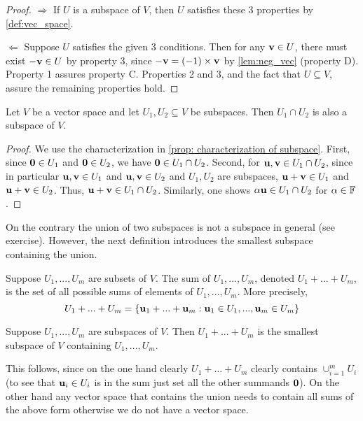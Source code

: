 \documentclass{article}
\begin{document}
\begin{proof}
$\Rightarrow$ If $U$ is a subspace of $V$, then $U$ satisfies these 3 properties by \cref{def:vec_space}.

$\Leftarrow$ Suppose $U$ satisfies the given 3 conditions. Then for any ${\mathbf{v}} \in U$, there must exist $-{\mathbf{v}} \in U$ by property 3, since $-{\mathbf{v}} = (-1) \times {\mathbf{v}}$ by \cref{lem:neg_vec} (property D). Property 1 assures property C. Properties 2 and 3, and the fact that $U \subseteq V$, assure the remaining properties hold. 
\end{proof}

\begin{proposition}
 Let $V$ be a vector space and let $U_1, U_2 \subseteq V$ be subspaces. Then $U_1 \cap U_2$ is also a subspace of $V$. 
\end{proposition}

\begin{proof}
We use the characterization in \cref{prop: characterization of subspace}. First, since ${\mathbf{0}} \in U_1$ and ${\mathbf{0}}\in U_2$, we have ${\mathbf{0}}\in U_1 \cap U_2$. Second, for ${\mathbf{u}}, {\mathbf{v}} \in U_1\cap U_2$, since in particular ${\mathbf{u}},{\mathbf{v}} \in U_1$ and ${\mathbf{u}},{\mathbf{v}} \in U_2$ and $U_1, U_2$ are subspaces, ${\mathbf{u}}+{\mathbf{v}}\in U_1$ and ${\mathbf{u}}+{\mathbf{v}}\in U_2$. Thus, ${\mathbf{u}}+{\mathbf{v}} \in U_1 \cap U_2$. Similarly, one shows $\alpha {\mathbf{u}} \in U_1\cap U_2$ for $\alpha \in {\mathbb{F}}$.
\end{proof}

On the contrary the union of two subspaces is not a subspace in general (see exercise). However, the next definition introduces the smallest subspace containing the union.

\begin{definition}
Suppose $U_{1},...,U_{m}$ are subsets of $V$. The sum
of $U_{1},...,U_{m}$, denoted $U_{1}+...+U_{m}$, is the set of all
possible sums of elements of $U_{1},...,U_{m}.$ More precisely,
\[
U_{1}+...+U_{m}=\{{\mathbf{u}}_{1}+...+{\mathbf{u}}_{m}:{\mathbf{u}}_{1}\in U_{1},...,{\mathbf{u}}_{m}\in U_{m}\}
\]
\end{definition}


\begin{proposition}
Suppose $U_{1},...,U_{m}$ are subspaces of $V$. Then
$U_{1}+...+U_{m}$ is the smallest subspace of $V$ containing $U_{1},...,U_{m}$.
\end{proposition}

This follows, since on the one hand clearly $U_1 + \ldots + U_m$ clearly contains $\cup_{i=1}^m U_i$ (to see that ${\mathbf{u}}_i \in U_i$ is in the sum just set all the other summands ${\mathbf{0}}$). On the other hand any vector space that contains the union needs to contain all sums of the above form otherwise we do not have a vector space. 
\end{document}
